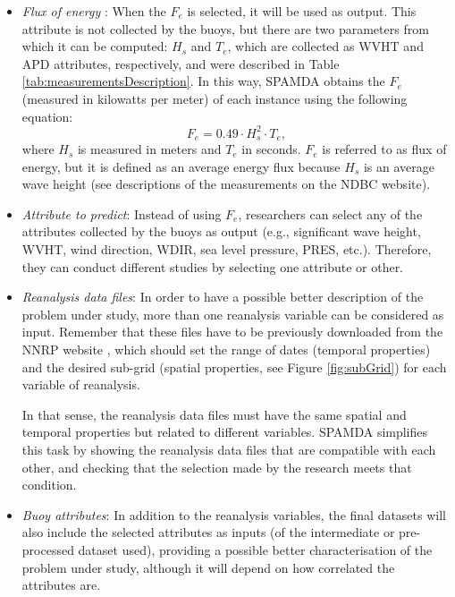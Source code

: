\documentclass[energies,article,accept,moreauthors,pdftex]{Definitions/mdpi}
\begin{document}
\begin{paracol}{2}
\begin{itemize}
					\item \textit{Flux of energy} \cite{FERNANDEZ201544}: When the $F_e$ is selected, it will be used as output. This attribute is not collected by the buoys, but there are two parameters from which it can be computed: $H_s$ and $T_e$, which are collected as WVHT and APD attributes, respectively, and were described in Table \ref{tab:measurementsDescription}. In this way, SPAMDA obtains the $F_e$ (measured in kilowatts per meter) of each instance using the following equation:
					\begin{equation}
							F_e = 0.49 \cdot H^2_s \cdot T_e,
							\label{eq:fluxOfEnergy}
					\end{equation}
where $H_s$ is measured in meters and $T_e$ in seconds. $F_e$ is referred to as flux of energy, but it is defined as an average energy flux because $H_s$ is an average wave height (see descriptions of the measurements on the NDBC website).
					
					\item \textit{Attribute to predict}: Instead of using $F_e$, researchers can select any of the attributes collected by the buoys as output (e.g., significant wave height, WVHT, wind direction, WDIR, sea level pressure, PRES, etc.). Therefore, they can conduct different studies by selecting one attribute or other.

					\item \textit{Reanalysis data files}: In order to have a possible better description of the problem under study, more than one reanalysis variable can be considered as input. Remember that these files have to be previously downloaded from the NNRP website \cite{NNRP}, which should set the range of dates (temporal properties) and the desired sub-grid (spatial properties, see Figure \ref{fig:subGrid}) for each variable of reanalysis.
					
					In that sense, the reanalysis data files must have the same spatial and temporal properties but related to different variables. SPAMDA simplifies this task by showing the reanalysis data files that are compatible with each other, and checking that the selection made by the research meets that condition.
					
					\item \textit{Buoy attributes}: In addition to the reanalysis variables, the final datasets will also include the selected attributes as inputs (of the intermediate or pre-processed dataset used), providing a possible better characterisation of the problem under study, although it will depend on how correlated the attributes are.


\end{itemize}
\end{paracol}
\end{document}
